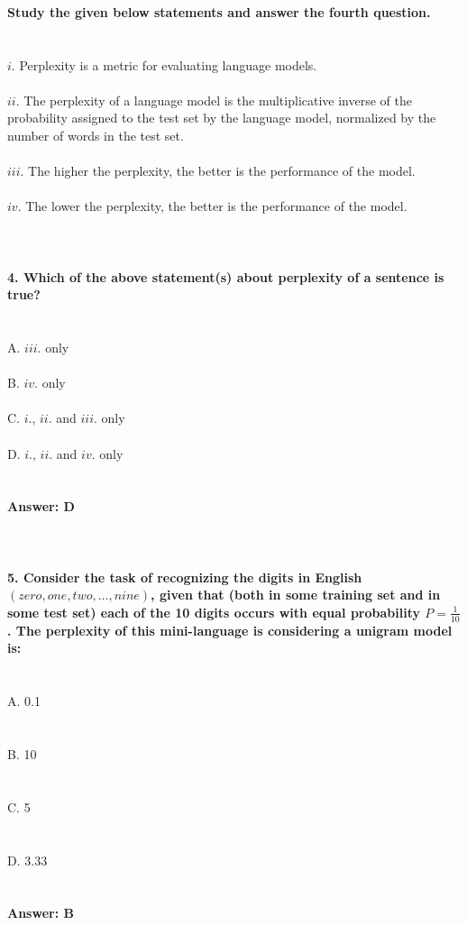 \documentclass[prl,twocolumn,showpacs,preprintnumbers,superscriptaddress]{revtex4}
\theoremstyle{plain}
\theoremstyle{definition}
\begin{document}
\begin{widetext}
\\
\\
\\
\textbf{Study the given below statements and answer the fourth question.}
\\
\\
\\
$i.$ Perplexity is a metric for evaluating language models.
\\
\\
$ii.$ The perplexity of a language model is the multiplicative inverse of the probability assigned to the test set by the language model, normalized by the number of words in the test set.
\\
\\
$iii.$ The higher the perplexity, the better is the performance of the model.
\\
\\
$iv.$ The lower the perplexity, the better is the performance of the model.
\\
\\
\\
\\
\textbf{4. Which of the above statement(s) about perplexity of a sentence is true?}
\\
\\
\\
A. $iii.$ only 
\\
\\
B. $iv.$ only
\\
\\
C. $i.$, $ii.$ and $iii.$ only
\\
\\
D. $i.$, $ii.$ and $iv.$ only
\\
\\
\\
\textbf{Answer: D}
\\
\\
\\
\\
\textbf{5. Consider the task of recognizing the digits
in English $(zero, one, two, \dots, nine)$, given that (both in some training set and in some test set) each of the 10 digits occurs with equal probability $P = \frac{1}{10}$. The perplexity of this mini-language is considering a unigram model is:}
\\
\\
\\
A. 0.1
\\
\\
\\
B. 10 
\\
\\
\\
C. 5 
\\
\\
\\
D. 3.33
\\
\\
\\
\textbf{Answer: B}
\\
\\
\\
\\
\\
\end{widetext}
\end{document}
